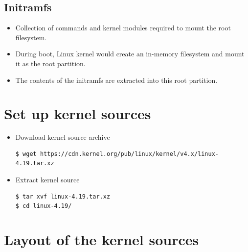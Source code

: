 \documentclass{beamer}
\begin{document}
\subsection{Initramfs}
\begin{frame}
  \begin{itemize}
  \item Collection of commands and kernel modules required to mount the root
    filesystem.
  \item During boot, Linux kernel would create an in-memory filesystem and
    mount it as the root partition.
  \item The contents of the initramfs are extracted into this root partition.
  \end{itemize}
\end{frame}


\section{Set up kernel sources}
\label{sec:set-up-kernel-1}

\begin{frame}[fragile]
  \begin{itemize}
  \item Download kernel source archive
    \begin{lstlisting}
$ wget https://cdn.kernel.org/pub/linux/kernel/v4.x/linux-4.19.tar.xz
    \end{lstlisting}

  \item Extract kernel source
    \begin{lstlisting}
$ tar xvf linux-4.19.tar.xz 
$ cd linux-4.19/
    \end{lstlisting}
  \end{itemize}
\end{frame}

\section{Layout of the kernel sources}
\label{sec:layout-kernel-source}
\end{document}
